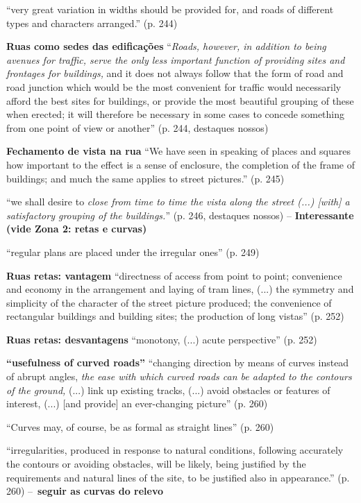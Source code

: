 \documentclass[12pt, a4paper]{book} %
\begin{document}
        ``very great variation in widths should be provided for, and roads of different types and characters arranged.'' (p. 244)

        \textbf{Ruas como sedes das edificações} ``\textit{Roads, however, in addition to being avenues for traffic, serve the only less important function of providing sites and frontages for buildings,} and it does not always follow that the form of road and road junction which would be the most convenient for traffic would necessarily afford the best sites for buildings, or provide the most beautiful grouping of these when erected; it will therefore be necessary in some cases to concede something from one point of view or another'' (p. 244, destaques nossos)

        \textbf{Fechamento de vista na rua} ``We have seen in speaking of places and squares how important to the effect is a sense of enclosure, the completion of the frame of buildings; and much the same applies to street pictures.'' (p. 245)

        ``we shall desire to \textit{close from time to time the vista along the street (...) [with] a satisfactory grouping of the buildings.}'' (p. 246, destaques nossos) – \textbf{Interessante (vide Zona 2: retas e curvas)}

        ``regular plans are placed under the irregular ones'' (p. 249)

        \textbf{Ruas retas: vantagem} ``directness of access from point to point; convenience and economy in the arrangement and laying of tram lines, (...) the symmetry and simplicity of the character of the street picture produced; the convenience of rectangular buildings and building sites; the production of long vistas'' (p. 252)

        \textbf{Ruas retas: desvantagens} ``monotony, (...) acute perspective'' (p. 252)

        \textbf{``usefulness of curved roads''} ``changing direction by means of curves instead of abrupt angles, \textit{the ease with which curved roads can be adapted to the contours of the ground,} (...) link up existing tracks, (...) avoid obstacles or features of interest, (...) [and provide] an ever-changing picture'' (p. 260)

        ``Curves may, of course, be as formal as straight lines'' (p. 260)

        ``irregularities, produced in response to natural conditions, following accurately the contours or avoiding obstacles, will be likely, being justified by the requirements and natural lines of the site, to be justified also in appearance.'' (p. 260) – \textbf{seguir as curvas do relevo}
\end{document}

